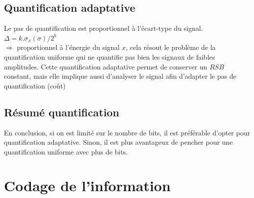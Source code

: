 \documentclass[a4paper,12pt,oneside]{report}	%
\begin{document}
        \subsection{Quantification adaptative}
            \colorbox{bright-blue}{Le pas de quantification est proportionnel à l'écart-type du signal.}\\
            $\Delta = k.\sigma_x(\sigma)/2^b$\\
            $\Rightarrow$ proportionnel à l'énergie du signal $x$, cela résout le problème de la quantification uniforme qui ne quantifie pas bien les signaux de faibles amplitudes. Cette quantification adaptative permet de conserver un $RSB$ constant, mais elle implique aussi d'analyser le signal afin d'adapter le pas de quantification \colorbox{bright-red}{(coût)}
            
        \subsection*{Résumé quantification}
            En conclusion, si on est limité sur le nombre de bits, il est préférable d'opter pour quantification adaptative. Sinon, il est plus avantageux de pencher pour une quantification uniforme avec plus de bits.
\newpage


    \section{Codage de l'information}
\end{document}
